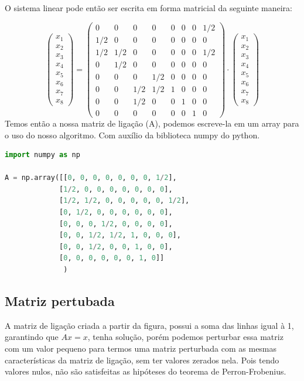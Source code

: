 \documentclass[a4paper, 12pt]{article}
\begin{document}
O sistema linear pode então ser escrita em forma matricial da seguinte maneira:

$$\begin{pmatrix}
x_1\\
x_2\\
x_3\\
x_4\\
x_5\\
x_6\\
x_7\\
x_8
\end{pmatrix}=\begin{pmatrix}
0 & 0 & 0 & 0 & 0 & 0 & 0 & 1/2\\
1/2 & 0 & 0 & 0 & 0 & 0 & 0 & 0\\
1/2 & 1/2 & 0 & 0 & 0 & 0 & 0 & 1/2\\
0 & 1/2 & 0 & 0 & 0 & 0 & 0 & 0\\
0 & 0 & 0 & 1/2 & 0 & 0 & 0 & 0\\
0 & 0 & 1/2 & 1/2 & 1 & 0 & 0 & 0\\
0 & 0 & 1/2 & 0 & 0 & 1 & 0 & 0\\
0 & 0 & 0 & 0 & 0 & 0 & 1 & 0
\end{pmatrix}\cdot\begin{pmatrix}
x_1\\
x_2\\
x_3\\
x_4\\
x_5\\
x_6\\
x_7\\
x_8
\end{pmatrix}
$$
Temos então a nossa matriz de ligação (A), podemos escreve-la em um array para o uso do nosso algoritmo. Com auxílio da biblioteca numpy do python.

\begin{lstlisting}[language=Python, caption = Matriz de Ligação A]
import numpy as np

A = np.array([[0, 0, 0, 0, 0, 0, 0, 1/2],
             [1/2, 0, 0, 0, 0, 0, 0, 0],
             [1/2, 1/2, 0, 0, 0, 0, 0, 1/2],
             [0, 1/2, 0, 0, 0, 0, 0, 0],
             [0, 0, 0, 1/2, 0, 0, 0, 0],
             [0, 0, 1/2, 1/2, 1, 0, 0, 0],
             [0, 0, 1/2, 0, 0, 1, 0, 0],
             [0, 0, 0, 0, 0, 0, 1, 0]]              
              )
\end{lstlisting}

\subsection{Matriz pertubada}
A matriz de ligação criada a partir da figura, possui a soma das linhas igual à 1, garantindo que $Ax=x$, tenha solução, porém podemos perturbar essa matriz com um valor pequeno para termos uma matriz perturbada com as mesmas características da matriz de ligação, sem ter valores zerados nela. Pois tendo valores nulos, não são satisfeitas as hipóteses do teorema de Perron-Frobenius.
\end{document}
